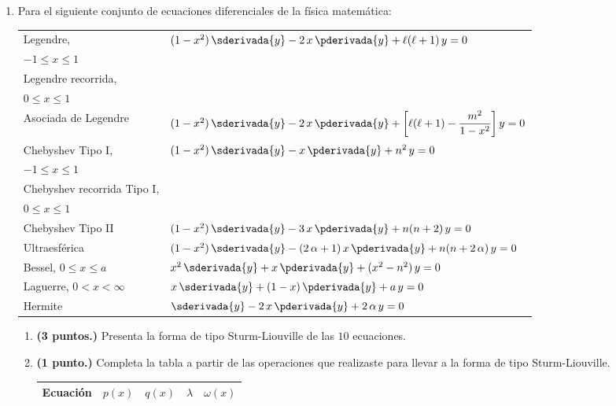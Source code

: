 \begin{enumerate}
\item Para el siguiente conjunto de ecuaciones diferenciales de la física matemática:
\begin{table}[H]
\renewcommand{\arraystretch}{1.1}
\begin{tabular}{l l}
Legendre, & \multirow{4}{*}{$(1 -x^{2}) \, \sderivada{y} - 2 \, x \, \pderivada{y} + \ell (\ell + 1) \, y = 0$} \\
$-1 \leq x \leq 1$ & \\ 
Legendre recorrida, & \\
$0 \leq x \leq 1$ &  \\ \hline
Asociada de Legendre & $(1 -x^{2}) \, \sderivada{y} - 2 \, x \, \pderivada{y} + \bigg[ \ell (\ell + 1) - \dfrac{m^{2}}{1 -x^{2}} \bigg] \, y = 0$ \\ \hline
Chebyshev Tipo I, & \multirow{4}{*}{$(1 -x^{2}) \, \sderivada{y} - x \, \pderivada{y} + n^{2} \, y = 0$} \\
$-1 \leq x \leq 1$ & \\
Chebyshev recorrida Tipo I, & \\
$0 \leq x \leq 1$ & \\ \hline
Chebyshev Tipo II & $(1 -x^{2}) \, \sderivada{y} - 3 \, x \, \pderivada{y} + n(n +2) \, y = 0$ \\
Ultraesférica & $ (1 - x^{2}) \, \sderivada{y} - (2 \, \alpha + 1) \, x \, \pderivada{y} + n (n + 2 \, \alpha) \, y = 0$ \\
Bessel, $0 \leq x \leq a$ & $x^{2} \, \sderivada{y} + x \, \pderivada{y} + (x^{2} -n^{2}) \, y = 0$ \\
Laguerre, $0 < x < \infty$ & $x \, \sderivada{y} + (1 - x) \, \pderivada{y} + a \, y = 0$ \\
Hermite & $\sderivada{y} - 2 \, x \, \pderivada{y} + 2 \, \alpha \, y = 0$
\end{tabular}
\end{table}
\begin{enumerate}[label=\roman*)]
\item \textbf{(3 puntos.) } Presenta la forma de tipo Sturm-Liouville de las $10$ ecuaciones.
\item \textbf{(1 punto.) }Completa la tabla a partir de las operaciones que realizaste para llevar a la forma de tipo Sturm-Liouville.
\begin{table}[H]
\centering
\renewcommand{\arraystretch}{1.1}
\begin{tabular}{l p{3cm} p{2cm} p{1.5cm} p{1.5cm}}
Ecuación & $p (x)$ & $q (x)$ & $\lambda$ & $\omega (x)$ \\ \hline

\end{tabular}
\end{table}
\end{enumerate}
\end{enumerate}

